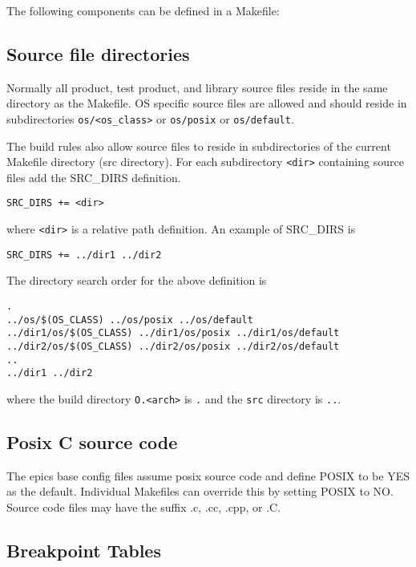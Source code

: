 The following components can be defined in a Makefile:

\subsection{Source file directories}

Normally all product, test product, and library source files reside in the same directory as the Makefile. OS specific source 
files are allowed and should reside in subdirectories \verb|os/<os_class>| or \verb|os/posix| or \verb|os/default|. 

The build rules also allow source files to reside in subdirectories of the current Makefile directory (src directory). For 
each subdirectory \verb|<dir>| containing source files add the SRC\_DIRS definition. 

\begin{verbatim}
SRC_DIRS += <dir>
\end{verbatim}

where \verb|<dir>| is a relative path definition. An example of SRC\_DIRS is

\begin{verbatim}
SRC_DIRS += ../dir1 ../dir2
\end{verbatim}

The directory search order for the above definition is 

\begin{verbatim}
. 
../os/$(OS_CLASS) ../os/posix ../os/default
../dir1/os/$(OS_CLASS) ../dir1/os/posix ../dir1/os/default 
../dir2/os/$(OS_CLASS) ../dir2/os/posix ../dir2/os/default
..
../dir1 ../dir2
\end{verbatim}

where the build directory \verb|O.<arch>| is \verb|.| and the \verb|src| directory is \verb|..|. 

\subsection{Posix C source code}

The epics base config files assume posix source code and define POSIX to be YES as the default. Individual Makefiles 
can override this by setting POSIX to NO. Source code files may have the suffix .c, .cc, .cpp, or .C.

\subsection{Breakpoint Tables}

